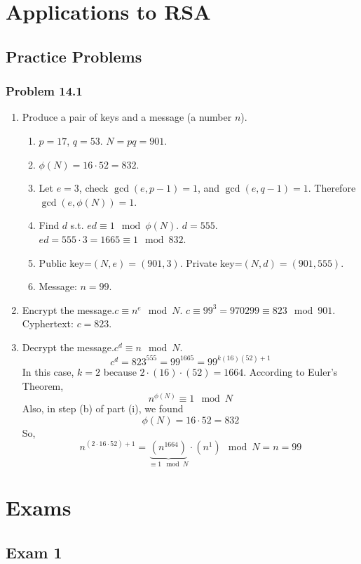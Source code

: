 \documentclass[hidelinks,12pt]{article}
\begin{document}
\section{Applications to RSA}
\subsection{Practice Problems}
\subsubsection{Problem 14.1}
\begin{enumerate}[label=(\roman*)]
    \item Produce a pair of keys and a message (a number $n$).
    \begin{enumerate}[label=(\alph*)]
        \item $p=17$, $q=53$. $N=pq=901$.
        \item $\phi(N)=16\cdot52=832$.
        \item Let $e=3$, check $\gcd(e,p-1)=1$, and $\gcd(e,q-1)=1$. Therefore $\gcd(e,\phi(N))=1$.
        \item Find $d$ s.t. $ed\equiv1\mod{\phi(N)}$. $d=555$.\newline $ed=555\cdot3=1665\equiv1\mod{832}$.
        \item Public key=$(N,e)=(901,3)$. \newline Private key=$(N,d)=(901,555)$.
        \item Message: $n=99$.
    \end{enumerate}
    \item Encrypt the message.\newline $c\equiv n^e\mod{N}$. \newline $c\equiv 99^3=970299\equiv823\mod{901}$. Cyphertext: $c=823$.
    \item Decrypt the message.\newline $c^d\equiv n\mod{N}$. $$c^d=823^{555}=99^{1665}=99^{k(16)(52)+1}$$ In this case, $k=2$ because $2\cdot(16)\cdot(52)=1664$. According to Euler's Theorem, $$n^{\phi(N)}\equiv1\mod{N}$$ Also, in step (b) of part (i), we found $$\phi(N)=16\cdot52=832$$ So, $$n^{(2\cdot16\cdot52)+1}=\underbrace{(n^{1664})}_{\equiv1\mod{N}}\cdot(n^1)\mod{N}=n=99$$
\end{enumerate}
\newpage
\section{Exams}
\subsection{Exam 1}
\end{document}
